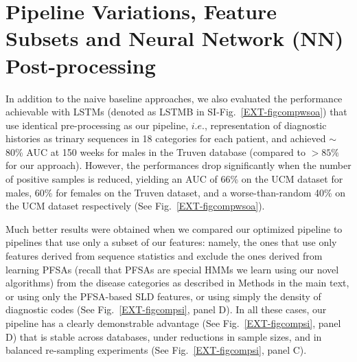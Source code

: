 \documentclass[onecolumn,,10pt]{IEEEtran}
\begin{document}
\section{Pipeline Variations, Feature Subsets and Neural Network (NN) Post-processing}\label{sec:pipelinevar}
In addition to the naive baseline approaches, we also evaluated the performance achievable  with LSTMs (denoted as LSTMB in SI-Fig.~\ref{EXT-figcompwsoa}) that use identical pre-processing as our pipeline, $i.e.$, representation of diagnostic histories as trinary sequences in 18 categories for each patient, and achieved $\sim$80\% AUC  at 150 weeks for males in the Truven database (compared to $> 85\%$ for our approach). However, the performances drop significantly when the number of positive samples is reduced, yielding an AUC of 66\% on the UCM dataset for males, 60\% for females on the Truven dataset, and a  worse-than-random 40\% on the UCM dataset respectively (See Fig.~\ref{EXT-figcompwsoa}). 

  Much better results were obtained when we compared our optimized pipeline to pipelines that use only a subset of our features: namely, the  ones that use only features derived from sequence statistics and exclude the ones derived from learning PFSAs (recall that PFSAs are special HMMs we learn using our novel algorithms)  from the disease categories as described in Methods in the main text, or using only the PFSA-based SLD features, or using simply the density of diagnostic codes (See Fig.~\ref{EXT-figcompsi}, panel D). In all these cases, our pipeline has a clearly demonstrable advantage (See  Fig.~\ref{EXT-figcompsi}, panel D) that is stable across databases,  under reductions in sample sizes, and in balanced re-sampling experiments (See Fig.~\ref{EXT-figcompsi}, panel C).
  
\end{document}
